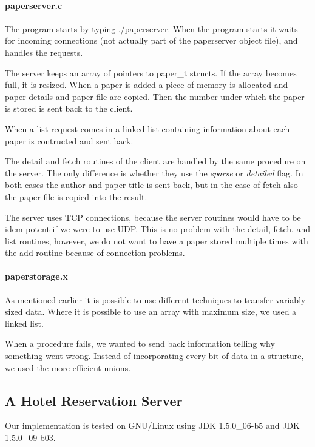 \documentclass[a4paper,10pt]{article}
\begin{document}
\paragraph{paperserver.c}
The program starts by typing ./paperserver. When the program starts it waits for incoming connections (not actually part of the paperserver object file), and handles the requests.

The server keeps an array of pointers to paper\_t structs. If the array becomes full, it is resized. When a paper is added a piece of memory is allocated and paper details and paper file are copied. Then the number under which the paper is stored is sent back to the client.

When a list request comes in a linked list containing information about each paper is contructed and sent back.

The detail and fetch routines of the client are handled by the same procedure on the server. The only difference is whether they use the \emph{sparse} or \emph{detailed} flag. In both cases the author and paper title is sent back, but in the case of fetch also the paper file is copied into the result.

The server uses TCP connections, because the server routines would have to be idem potent if we were to use UDP. This is no problem with the detail, fetch, and list routines, however, we do not want to have a paper stored multiple times with the add routine because of connection problems. 

\paragraph{paperstorage.x}
As mentioned earlier it is possible to use different techniques to transfer variably sized data. Where it is possible to use an array with maximum size, we used a linked list.

When a procedure fails, we wanted to send back information telling why something went wrong. Instead of incorporating every bit of data in a structure, we used the more efficient unions.

\subsection{A Hotel Reservation Server}
Our implementation is tested on GNU/Linux using JDK 1.5.0\_06-b5 and JDK 1.5.0\_09-b03.
\end{document}
